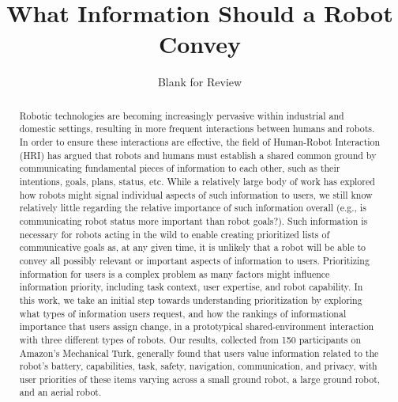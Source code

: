 \documentclass[letterpaper, 10 pt, conference]{ieeeconf}  %
\title{\LARGE \bf
What Information Should a Robot Convey
}
\author{Blank for Review}
\newcommand\hooman[1]{\textcolor{red}{HoOman--#1}}
\begin{document}
\maketitle

\thispagestyle{empty}
\pagestyle{empty}


\begin{abstract}
Robotic technologies are becoming increasingly pervasive within industrial and domestic settings, resulting in more frequent interactions between humans and robots. In order to ensure these interactions are effective, the field of Human-Robot Interaction (HRI) has argued that robots and humans must establish a shared common ground by communicating fundamental pieces of information to each other, such as their intentions, goals, plans, status, etc. While a relatively large body of work has explored how robots might signal individual aspects of such information to users, we still know relatively little regarding the relative importance of such information overall (e.g., is communicating robot status more important than robot goals?). Such information is necessary for robots acting in the wild to enable creating prioritized lists of communicative goals as, at any given time, it is unlikely that a robot will be able to convey all possibly relevant or important aspects of information to users. Prioritizing information for users is a complex problem as many factors might influence information priority, including task context, user expertise, and robot capability. In this work, we take an initial step towards understanding prioritization by exploring what types of information users request, and how the rankings of informational importance that users assign change, in a prototypical shared-environment interaction with three different types of robots. Our results, collected from 150 participants on Amazon's Mechanical Turk, generally found that users value information related to the robot's battery, capabilities, task, safety, navigation, communication, and privacy, with user priorities of these items varying across a small ground robot, a large ground robot, and an aerial robot.  %
\end{abstract}
\end{document}
